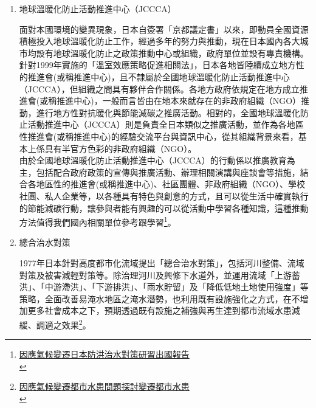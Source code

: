 \documentclass[a4paper,12pt]{article}
\begin{document}
\begin{enumerate}
\begin{enumerate}
\item 地球溫暖化防止活動推進中心（JCCCA）
\label{sec:org33c3bf7}

面對本國環境的變異現象，日本自簽署「京都議定書」以來，即動員全國資源積極投入地球溫暖化防止工作，經過多年的努力與推動，現在日本國內各大城市均設有地球溫暖化防止之政策推動中心或組織，政府單位並設有專責機構。\\

針對1999年實施的「溫室效應策略促進相關法」，日本各地皆陸續成立地方性的推進會(或稱推進中心)，且不隸屬於全國地球溫暖化防止活動推進中心（JCCCA），但組織之間具有夥伴合作關係。各地方政府依規定在地方成立推進會(或稱推進中心)，一般而言皆由在地本來就存在的非政府組織（NGO）推動，進行地方性對抗暖化與節能減碳之推廣活動。相對的，全國地球溫暖化防止活動推進中心（JCCCA）則是負責全日本類似之推廣活動，並作為各地區性推進會(或稱推進中心)的經驗交流平台與資訊中心，從其組織背景來看，基本上係具有半官方色彩的非政府組織（NGO）。\\

由於全國地球溫暖化防止活動推進中心（JCCCA）的行動係以推廣教育為主，包括配合政府政策的宣傳與推廣活動、辦理相關演講與座談會等措施，結合各地區性的推進會(或稱推進中心)、社區團體、非政府組織（NGO）、學校社團、私人企業等，以各種具有特色與創意的方式，且可以從生活中確實執行的節能減碳行動，讓參與者能有興趣的可以從活動中學習各種知識，這種推動方法值得我們國內相關單位參考跟學習\footnote{\href{https://www.google.com/url?sa=t\&rct=j\&q=\&esrc=s\&source=web\&cd=\&ved=2ahUKEwib2OL31MLvAhVyF6YKHcy4Cp4QFjABegQIBhAD\&url=https\%3A\%2F\%2Fws.ndc.gov.tw\%2FDownload.ashx\%3Fu\%3DLzAwMS9hZG1pbmlzdHJhdG9yLzEwL3JlbGZpbGUvNTY1OC80MjUxLzgyOTIyN2QzLTA4MDYtNDBjYS04MGMwLTQyMzA3MmZjM2I3ZC5wZGY\%253D\%26n\%3DOTgwNzA15Zug5oeJ5rCj5YCZ6K6K6YG35pel5pys6Ziy5rSq5rK75rC05bCN562WLnBkZg\%253D\%253D\%26icon\%3D..pdf\&usg=AOvVaw2xKxAX\_XQpcGVM6dD17x9d}{因應氣候變遷日本防洪治水對策研習出國報告}\\\label{org7a7a63c}}。\\

\item 總合治水對策
\label{sec:org4fccfd3}

1977年日本針對高度都市化流域提出「總合治水對策」，包括河川整備、流域對策及被害減輕對策等。除治理河川及興修下水道外，並運用流域「上游蓄洪」、「中游滯洪」、「下游排洪」、「雨水貯留」及「降低低地土地使用強度」等策略，全面改善易淹水地區之淹水潛勢，也利用既有設施強化之方式，在不增加更多社會成本之下，預期透過既有設施之補強與再生達到都市流域水患減緩、調適之效果\footnote{\href{https://www.google.com/url?sa=t\&rct=j\&q=\&esrc=s\&source=web\&cd=\&ved=2ahUKEwiT6crnt7zvAhWhF6YKHZw8BAwQFjABegQIAhAD\&url=https\%3A\%2F\%2Fws.ndc.gov.tw\%2FDownload.ashx\%3Fu\%3DLzAwMS9hZG1pbmlzdHJhdG9yLzEwL3JlbGZpbGUvNTY0NC8zMjcxLzAwNTg5NTNfMS5wZGY\%253D\%26n\%3DMjAxMjA4MjcxNTQ2MjE3Mjc0NTc3LnBkZg\%253D\%253D\%26icon\%3D..pdf\&usg=AOvVaw18hKOrOs--51JlqZQSVdDY}{因應氣候變遷都市水患問題探討變遷都市水患}\\\label{orgccbf4f9}}。\\


\end{enumerate}
\end{enumerate}
\end{document}
